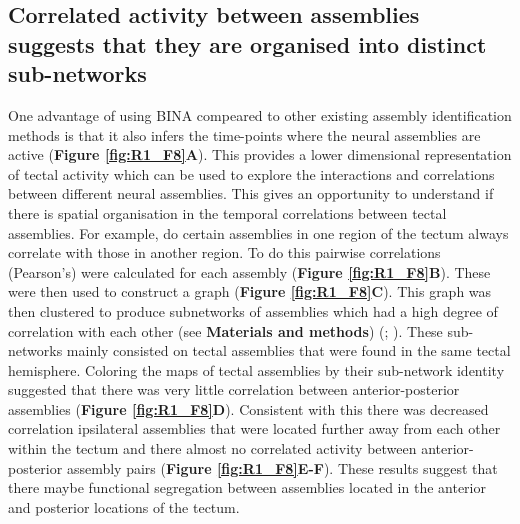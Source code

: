 \subsection{Correlated activity between assemblies suggests that they are organised into distinct sub-networks}
One advantage of using BINA compeared to other existing assembly identification methods is that it also infers the time-points where the neural assemblies are active (\textbf{Figure \ref{fig:R1_F8}A}). This provides a lower dimensional representation of tectal activity which can be used to explore the interactions and correlations between different neural assemblies. This gives an opportunity to understand if there is spatial organisation in the temporal correlations between tectal assemblies. For example, do certain assemblies in one region of the tectum always correlate with those in another region.  To do this pairwise correlations (Pearson's) were calculated for each assembly (\textbf{Figure \ref{fig:R1_F8}B}). These were then used to construct a graph (\textbf{Figure \ref{fig:R1_F8}C}). This graph was then clustered to produce subnetworks of assemblies which had a high degree of correlation with each other  (see \textbf{Materials and methods}) (\cite{Newman2004FindingNetworks}; \cite{Csardi2006TheResearch}). These sub-networks mainly consisted on tectal assemblies that were found in the same tectal hemisphere. Coloring the maps of tectal assemblies by their sub-network identity suggested that there was very little correlation between anterior-posterior assemblies (\textbf{Figure \ref{fig:R1_F8}D}). Consistent with this there was decreased correlation  ipsilateral assemblies that were located further away from each other within the tectum and there almost no correlated activity between anterior-posterior assembly pairs (\textbf{Figure \ref{fig:R1_F8}E-F}). These results suggest that there maybe functional segregation between assemblies located in the anterior and posterior locations of the tectum.


